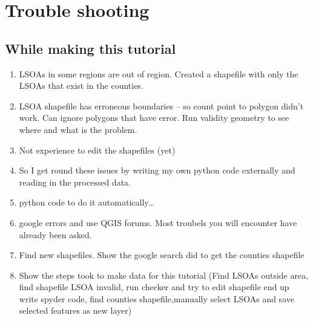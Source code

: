 \chapter{Trouble shooting}

\pagestyle{fancy}
\fancyhf{}
\fancyhead[OC]{\leftmark}
\fancyhead[EC]{\rightmark}
\cfoot{\thepage}


\section{While making this tutorial}

\begin{enumerate}[~~~1)]
	\item
LSOAs in some regions are out of region. Created a shapefile with only the LSOAs that exist in the counties.
	\item

LSOA shapefile has erroneous boundaries – so count point to polygon didn’t work. Can ignore polygons that have error. Run validity geometry to see where and what is the problem.
	\item
Not experience to edit the shapefiles (yet)
	\item
So I get round these issues by writing my own python code externally and reading in the processed data.
	\item
python code to do it automatically…
	\item
google errors and use QGIS forums. Most troubels you will encounter have already been asked.
	\item
Find new shapefiles. Show the google search did to get the counties shapefile
	\item
Show the steps took to make data for this tutorial (Find LSOAs outside area, find shapefile LSOA invalid, run checker and try to edit shapefile end up write spyder code, find counties shapefile,manually select LSOAs and save selected features as new layer)
\end{enumerate}
